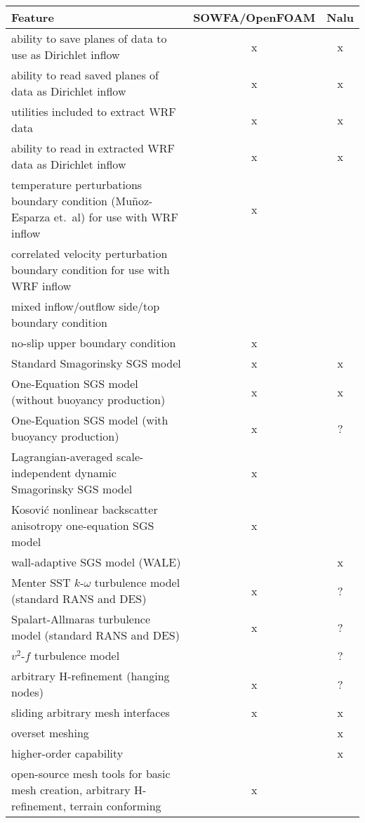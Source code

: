 \documentclass{article}
\begin{document}
\begin{center}
\begin{tabular}{ l | c | c }
\toprule
\textbf{Feature} & \textbf{SOWFA/OpenFOAM} & \textbf{Nalu} \\


\midrule
ability to save planes of data to use as Dirichlet inflow & x & x \\
ability to read saved planes of data as Dirichlet inflow & x & x \\
utilities included to extract WRF data & x & x \\
ability to read in extracted WRF data as Dirichlet inflow & x & x \\
temperature perturbations boundary condition (Mu\~noz-Esparza et.~al) for use with WRF inflow & x &   \\
correlated velocity perturbation boundary condition for use with WRF inflow &   &   \\
mixed inflow/outflow side/top boundary condition &  &  \\
no-slip upper boundary condition & x &   \\


\midrule
Standard Smagorinsky SGS model & x & x \\
One-Equation SGS model (without buoyancy production) & x & x \\
One-Equation SGS model (with buoyancy production) & x & ? \\
Lagrangian-averaged scale-independent dynamic Smagorinsky SGS model & x &   \\
Kosovi\'{c} nonlinear backscatter anisotropy one-equation SGS model & x &   \\
wall-adaptive SGS model (WALE) &   & x \\


\midrule
Menter SST $k$-$\omega$ turbulence model (standard RANS and DES) & x & ? \\
Spalart-Allmaras turbulence model (standard RANS and DES) & x & ? \\
$v^2$-$f$ turbulence model &  & ? \\


\midrule
arbitrary H-refinement (hanging nodes) & x & ? \\
sliding arbitrary mesh interfaces & x & x \\
overset meshing &  & x \\
higher-order capability &  & x \\
open-source mesh tools for basic mesh creation, arbitrary H-refinement, terrain conforming & x &   \\



\end{tabular}
\end{center}
\end{document}
